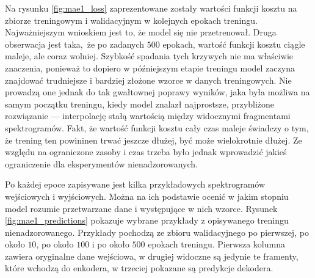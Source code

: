 Na rysunku \ref{fig:mae1_loss} zaprezentowane zostały wartości funkcji kosztu na zbiorze treningowym i walidacyjnym w kolejnych epokach treningu. Najważniejszym wnioskiem jest to, że model się nie przetrenował. Druga obserwacja jest taka, że po zadanych $500$ epokach, wartość funkcji kosztu ciągle maleje, ale coraz wolniej. Szybkość spadania tych krzywych nie ma właściwie znaczenia, ponieważ to dopiero w późniejszym etapie treningu model zaczyna znajdować trudniejsze i bardziej złożone wzorce w danych treningowych. Nie prowadzą one jednak do tak gwałtownej poprawy wyników, jaka była możliwa na samym początku treningu, kiedy model znalazł najprostsze, przybliżone rozwiązanie --- interpolację stałą wartością między widocznymi fragmentami spektrogramów. Fakt, że wartość funkcji kosztu cały czas maleje świadczy o tym, że trening ten powininen trwać jeszcze dłużej, być może wielokrotnie dłużej. Ze względu na ograniczone zasoby i czas trzeba było jednak wprowadzić jakieś ograniczenie dla eksperymentów nienadzorowanych.

Po każdej epoce zapisywane jest kilka przykładowych spektrogramów wejściowych i wyjściowych. Można na ich podstawie ocenić w jakim stopniu model rozumie przetwarzane dane i występujące w nich wzorce. Rysunek \ref{fig:mae1_predictions} pokazuje wybrane przykłady z opisywanego treningu nienadzorowanego. Przykłady pochodzą ze zbioru walidacyjnego po pierwszej, po około $10$, po około $100$ i po około $500$ epokach treningu. Pierwsza kolumna zawiera oryginalne dane wejściowa, w drugiej widoczne są jedynie te framenty, które wchodzą do enkodera, w trzeciej pokazane są predykcje dekodera.

